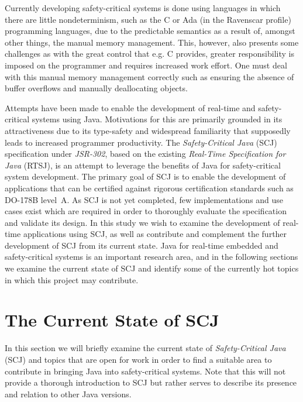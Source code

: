 Currently developing safety-critical systems is done using languages in which there are little nondeterminism, such as the C or Ada (in the Ravenscar profile) programming languages, due to the predictable semantics as a result of, amongst other things, the manual memory management. This, however, also presents some challenges as with the great control that e.g. C provides, greater responsibility is imposed on the programmer and requires increased work effort. One must deal with this manual memory management correctly such as ensuring the absence of buffer overflows and manually deallocating objects.

Attempts have been made to enable the development of real-time and safety-critical systems using Java. Motivations for this are primarily grounded in its attractiveness due to its type-safety and widespread familiarity that supposedly leads to increased programmer productivity\cite{henties:2009-20, Nilsen96issuesin}.
The \textit{Safety-Critical Java} (SCJ) specification under \textit{JSR-302}\cite{JSR, SCJSpec}, based on the existing \textit{Real-Time Specification for Java} (RTSJ), is an attempt to leverage the benefits of Java for safety-critical system development. The primary goal of SCJ is to enable the development of applications that can be certified against rigorous certification standards such as DO-178B level~A. As SCJ is not yet completed, few implementations and use cases exist which are required in order to thoroughly evaluate the specification and validate its design.
In this study we wish to examine the development of real-time applications using SCJ, as well as contribute and complement the further development of SCJ from its current state. Java for real-time embedded and safety-critical systems is an important research area, and in the following sections we examine the current state of SCJ and identify some of the currently hot topics in which this project may contribute.

\section{The Current State of SCJ}
In this section we will briefly examine the current state of \textit{Safety-Critical Java} (SCJ) and topics that are open for work in order to find a suitable area to contribute in bringing Java into safety-critical systems. Note that this will not provide a thorough introduction to SCJ but rather serves to describe its presence and relation to other Java versions.

